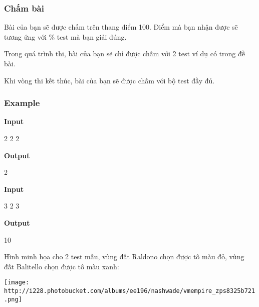 \subsubsection{   Chấm bài  }

   Bài của bạn sẽ được chấm trên thang điểm 100. Điểm mà bạn nhận được sẽ tương ứng với \% test mà bạn giải đúng.  

   Trong quá trình thi, bài của bạn sẽ chỉ được chấm với 2 test ví dụ có trong đề bài.  

   Khi vòng thi kết thúc, bài của bạn sẽ được chấm với bộ test đầy đủ.  

\subsubsection{   Example  }

\textbf{    Input   }

   2 2 2  

\textbf{    Output   }

   2  



\textbf{    Input   }

   3 2 3   \textbf{
\\}

\textbf{    Output   }

   10   \textbf{
\\}



   Hình minh họa cho 2 test mẫu, vùng đất Raldono chọn được tô màu đỏ, vùng đất Balitello chọn được tô màu xanh:   \textbf{
\\}


\texttt{[image: http://i228.photobucket.com/albums/ee196/nashwade/vmempire\_zps8325b721.png]}
